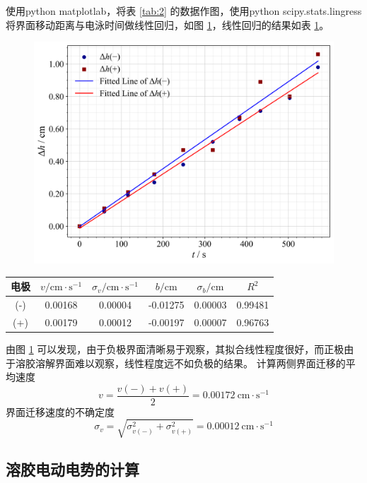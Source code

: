 使用python matplotlab，将表 \ref{tab:2} 的数据作图，使用python scipy.stats.lingress 将界面移动距离与电泳时间做线性回归，如图 \ref{fig:1}，线性回归的结果如表 \ref{tab:4}。

\begin{figure}[htbp]
    \centering
    \includegraphics[width=.8\textwidth]{figures/1.png}
    \label{fig:1}
\end{figure}
\begin{table}[htbp]
\centering
{}
\begin{tabular}{cccccc}
\toprule
电极 & $v / \mathrm{cm \cdot s}^{-1}$ & $\sigma_v / \mathrm{cm \cdot s}^{-1}$ & $b / \mathrm{cm}$ & $\sigma_b / \mathrm{cm}$ & $R^2$ \\
\midrule
(-) & 0.00168 & 0.00004 & -0.01275 & 0.00003 & 0.99481 \\
(+) & 0.00179 & 0.00012 & -0.00197 & 0.00007 & 0.96763 \\
\bottomrule
\end{tabular}
\label{tab:4}
\end{table}

由图 \ref{tab:4} 可以发现，由于负极界面清晰易于观察，其拟合线性程度很好，而正极由于溶胶溶解界面难以观察，线性程度远不如负极的结果。
计算两侧界面迁移的平均速度
$$
v=\frac{v(-)+v(+)}{2}=0.00172 \mathrm{~cm} \cdot \mathrm{s}^{-1}
$$
界面迁移速度的不确定度
$$
\sigma_v=\sqrt{\sigma_{v(-)}^2+\sigma_{v(+)}^2}=0.00012 \mathrm{~cm} \cdot \mathrm{s}^{-1}
$$

\subsection{溶胶电动电势的计算}

